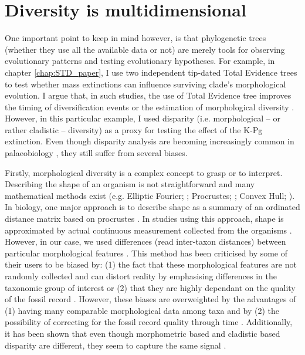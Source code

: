 \section{Diversity is multidimensional}
One important point to keep in mind however, is that phylogenetic trees (whether they use all the available data or not) are merely tools for observing evolutionary patterns and testing evolutionary hypotheses.
For example, in chapter \ref{chap:STD_paper}, I use two independent tip-dated Total Evidence trees to test whether mass extinctions can influence surviving clade's morphological evolution.
I argue that, in such studies, the use of Total Evidence tree improves the timing of diversification events \citep[][ which is a crucial aspect when studying effect of mass extinctions which are finites points in time]{ronquista2012} or the estimation of morphological diversity \citep[increasing accuracy in reconstructing node's ancestral characters;][]{Finarelli2006}.
However, in this particular example, I used disparity (i.e. morphological -- or rather cladistic -- diversity) as a proxy for testing the effect of the K-Pg extinction.
Even though disparity analysis are becoming increasingly common in palaeobiology \citep[e.g.]{Butler2012,brusattedinosaur2012,toljagictriassic-jurassic2013,brusattegradual2014,bensonfaunal2014,Claddis,Close2015}, they still suffer from several biases.

Firstly, morphological diversity is a complex concept to grasp or to interpret.
Describing the shape of an organism is not straightforward and many mathematical methods exist (e.g. Elliptic Fourier; \citealt{Fourier1982}; Procrustes; \citealt{JamesRohlf1993129}; Convex Hull; \citealt{ANDREW1979216}).
In biology, one major approach is to describe shape as a summary of an ordinated distance matrix based on procrustes \citep[i.e. a geometric morphometric approach][]{zelditch2012geometric}.
In studies using this approach, shape is approximated by actual continuous measurement collected from the organisms \citep[e.g.][]{friedmanexplosive2010,hopkinsdecoupling2013,finlay2015morphological}.
However, in our case, we used differences (read inter-taxon distances) between particular morphological features \citep[e.g.][]{foote1997evolution,Wills2001,Wesley-Hunt2005}.
This method has been criticised by some of their users to be biased by: (1) the fact that these morphological features are not randomly collected and can distort reality by emphasising differences in the taxonomic group of interest \citep{Hopkins24032015} or (2) that they are highly dependant on the quality of the fossil record \citep{Butler2012}.
However, these biases are overweighted by the advantages of (1) having many comparable morphological data among taxa \citep{Brusatte12092008} and by (2) the possibility of correcting for the fossil record quality through time \citep{Butler2012}.
Additionally, it has been shown that even though morphometric based and cladistic based disparity are different, they seem to capture the same signal \citep{foth2012different,hetherington2015cladistic}.

